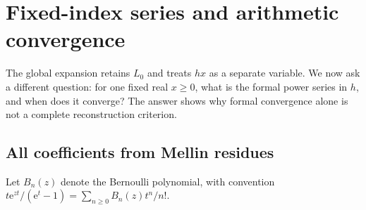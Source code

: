 \documentclass[11pt,a4paper]{article}
\numberwithin{equation}{section}
\theoremstyle{definition}
\newcommand{\ee}{\mathrm e}
\begin{document}
\section{Fixed-index series and arithmetic convergence}
\label{sec:arithmetic}

The global expansion retains $L_0$ and treats $hx$ as a separate variable. We now ask a different question: for one fixed real $x\ge0$, what is the formal power series in $h$, and when does it converge? The answer shows why formal convergence alone is not a complete reconstruction criterion.

\subsection{All coefficients from Mellin residues}
Let $B_n(z)$ denote the Bernoulli polynomial, with convention
$t\ee^{zt}/(\ee^t-1)=\sum_{n\ge0}B_n(z)t^n/n!$.
\end{document}
